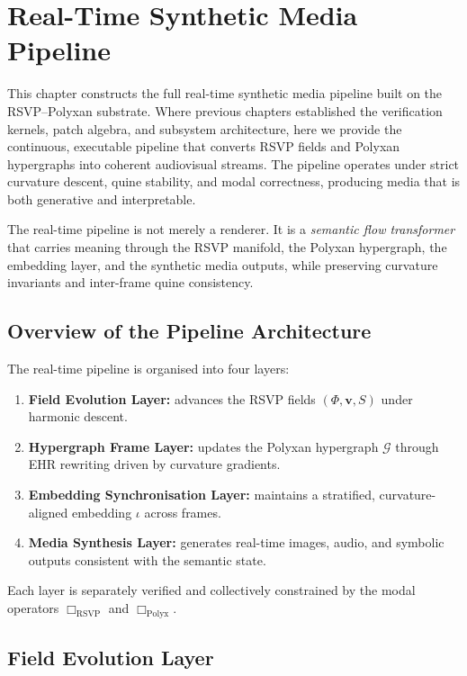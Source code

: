 \chapter{Real-Time Synthetic Media Pipeline}
\label{ch:53}

This chapter constructs the full real-time synthetic media pipeline built on the
RSVP--Polyxan substrate.  
Where previous chapters established the verification kernels, patch algebra,
and subsystem architecture, here we provide the continuous, executable pipeline
that converts RSVP fields and Polyxan hypergraphs into coherent audiovisual
streams.  
The pipeline operates under strict curvature descent, quine stability,
and modal correctness, producing media that is both generative and
interpretable.

The real-time pipeline is not merely a renderer.  
It is a \emph{semantic flow transformer} that carries meaning through the RSVP
manifold, the Polyxan hypergraph, the embedding layer, and the synthetic media
outputs, while preserving curvature invariants and inter-frame quine
consistency.


\section{Overview of the Pipeline Architecture}
\label{sec:53:overview}

The real-time pipeline is organised into four layers:

\begin{enumerate}
  \item \textbf{Field Evolution Layer:} advances the RSVP fields
        $(\Phi,\mathbf{v},S)$ under harmonic descent.
  \item \textbf{Hypergraph Frame Layer:} updates the Polyxan hypergraph
        $\mathcal{G}$ through EHR rewriting driven by curvature gradients.
  \item \textbf{Embedding Synchronisation Layer:} maintains a stratified,
        curvature-aligned embedding $\iota$ across frames.
  \item \textbf{Media Synthesis Layer:} generates real-time images, audio, and
        symbolic outputs consistent with the semantic state.
\end{enumerate}

Each layer is separately verified and collectively constrained by the modal
operators $\Box_{\mathrm{RSVP}}$ and $\Box_{\mathrm{Polyx}}$.


\section{Field Evolution Layer}
\label{sec:53:fields}

